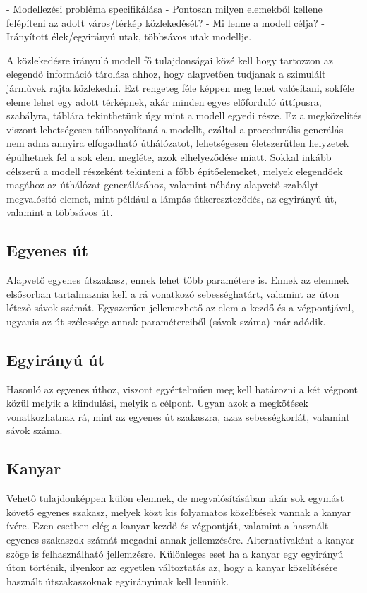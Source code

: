﻿

- Modellezési probléma specifikálása
- Pontosan milyen elemekből kellene felépíteni az adott város/térkép közlekedését?
- Mi lenne a modell célja?
- Irányított élek/egyirányú utak, többsávos utak modellje.

A közlekedésre irányuló modell fő tulajdonságai közé kell hogy tartozzon az elegendő információ tárolása ahhoz, hogy alapvetően tudjanak a szimulált 
járművek rajta közlekedni. Ezt rengeteg féle képpen meg lehet valósítani, sokféle eleme lehet egy adott térképnek, akár minden egyes előforduló úttípusra, 
szabályra, táblára tekinthetünk úgy mint a modell egyedi része. Ez a megközelítés viszont lehetségesen túlbonyolítaná a modellt, ezáltal a procedurális generálás
nem adna annyira elfogadható úthálózatot, lehetségesen életszerűtlen helyzetek épülhetnek fel a sok elem megléte, azok elhelyeződése miatt. Sokkal inkább célszerű a 
modell részeként tekinteni a főbb építőelemeket, melyek elegendőek magához az úthálózat generálásához, valamint néhány alapvető szabályt megvalósító elemet, mint például 
a lámpás útkereszteződés, az egyirányú út, valamint a többsávos út.
\subsection{Egyenes út}
Alapvető egyenes útszakasz, ennek lehet több paramétere is. Ennek az elemnek elsősorban tartalmaznia kell a rá vonatkozó sebességhatárt, valamint az úton létező sávok számát.
Egyszerűen jellemezhető az elem a kezdő és a végpontjával, ugyanis az út szélessége annak paramétereiből (sávok száma) már adódik.
\subsection{Egyirányú út}
Hasonló az egyenes úthoz, viszont egyértelműen meg kell határozni a két végpont közül melyik a kiindulási, melyik a célpont. Ugyan azok a megkötések vonatkozhatnak rá, mint az egyenes
út szakaszra, azaz sebességkorlát, valamint sávok száma.
\subsection{Kanyar}
Vehető tulajdonképpen külön elemnek, de megvalósításában akár sok egymást követő egyenes szakasz, melyek közt kis folyamatos közelítések vannak a kanyar ívére. Ezen esetben elég
a kanyar kezdő és végpontját, valamint a használt egyenes szakaszok számát megadni annak jellemzésére. Alternatívaként a kanyar szöge is felhasználható jellemzésre. Különleges eset
ha a kanyar egy egyirányú úton történik, ilyenkor az egyetlen változtatás az, hogy a kanyar közelítésére használt útszakaszoknak egyirányúnak kell lenniük.
